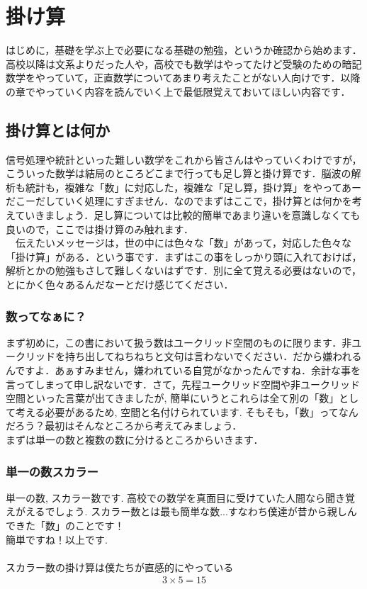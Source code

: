 \documentclass[11pt,a4paper]{ujreport}
\begin{document}
\chapter{掛け算}
はじめに，基礎を学ぶ上で必要になる基礎の勉強，というか確認から始めます．高校以降は文系よりだった人や，高校でも数学はやってたけど受験のための暗記数学をやっていて，正直数学についてあまり考えたことがない人向けです．以降の章でやっていく内容を読んでいく上で最低限覚えておいてほしい内容です．

\section{掛け算とは何か}
信号処理や統計といった難しい数学をこれから皆さんはやっていくわけですが，こういった数学は結局のところどこまで行っても足し算と掛け算です．脳波の解析も統計も，複雑な「数」に対応した，複雑な「足し算，掛け算」をやってあーだこーだしていく処理にすぎません．なのでまずはここで，掛け算とは何かを考えていきましょう．足し算については比較的簡単であまり違いを意識しなくても良いので，ここでは掛け算のみ触れます．\\
　伝えたいメッセージは，世の中には色々な「数」があって，対応した色々な「掛け算」がある．という事です．まずはこの事をしっかり頭に入れておけば，解析とかの勉強もさして難しくないはずです．別に全て覚える必要はないので，とにかく色々あるんだなーとだけ感じてください．
\subsection{数ってなぁに？}
まず初めに，この書において扱う数はユークリッド空間のものに限ります．非ユークリッドを持ち出してねちねちと文句は言わないでください．だから嫌われるんですよ．あぁすみません，嫌われている自覚がなかったんですね．余計な事を言ってしまって申し訳ないです．さて，先程ユークリッド空間や非ユークリッド空間といった言葉が出てきましたが, 簡単にいうとこれらは全て別の「数」として考える必要があるため, 空間と名付けられています. そもそも，「数」ってなんだろう？最初はそんなところから考えてみましょう．\\
まずは単一の数と複数の数に分けるところからいきます．\\

\subsection{単一の数スカラー}
単一の数, スカラー数です. 高校での数学を真面目に受けていた人間なら聞き覚えがえるでしょう. スカラー数とは最も簡単な数...すなわち僕達が昔から親しんできた「数」のことです！\\
簡単ですね！以上です.\\
\\
スカラー数の掛け算は僕たちが直感的にやっている
\begin{eqnarray}
\label{eq:kakezan}
3 \times 5 = 15
\end{eqnarray}
\end{document}
